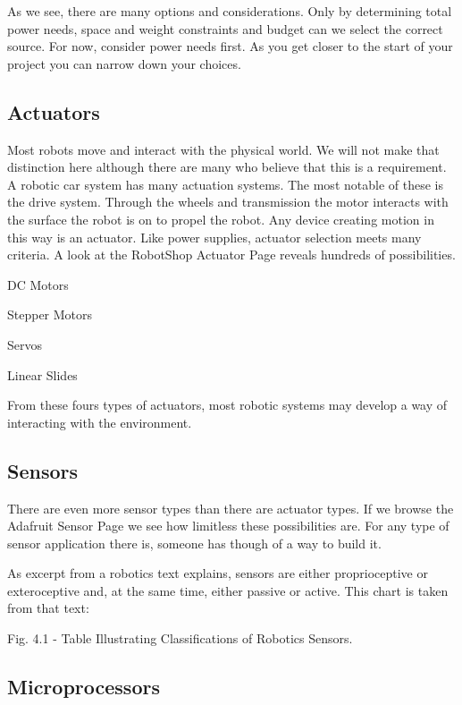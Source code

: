 \documentclass[
]{book}
\begin{document}
As we see, there are many options and considerations. Only by determining total power needs, space and weight constraints and budget can we select the correct source. For now, consider power needs first. As you get closer to the start of your project you can narrow down your choices.

\hypertarget{actuators}{%
\subsection{Actuators}\label{actuators}}

Most robots move and interact with the physical world. We will not make that distinction here although there are many who believe that this is a requirement. A robotic car system has many actuation systems. The most notable of these is the drive system. Through the wheels and transmission the motor interacts with the surface the robot is on to propel the robot. Any device creating motion in this way is an actuator. Like power supplies, actuator selection meets many criteria. A look at the RobotShop Actuator Page reveals hundreds of possibilities.

DC Motors

Stepper Motors

Servos

Linear Slides

From these fours types of actuators, most robotic systems may develop a way of interacting with the environment.

\hypertarget{sensors}{%
\subsection{Sensors}\label{sensors}}

There are even more sensor types than there are actuator types. If we browse the Adafruit Sensor Page we see how limitless these possibilities are. For any type of sensor application there is, someone has though of a way to build it.

As excerpt from a robotics text explains, sensors are either proprioceptive or exteroceptive and, at the same time, either passive or active. This chart is taken from that text:

Fig. 4.1 - Table Illustrating Classifications of Robotics Sensors.

\hypertarget{microprocessors}{%
\subsection{Microprocessors}\label{microprocessors}}
\end{document}
